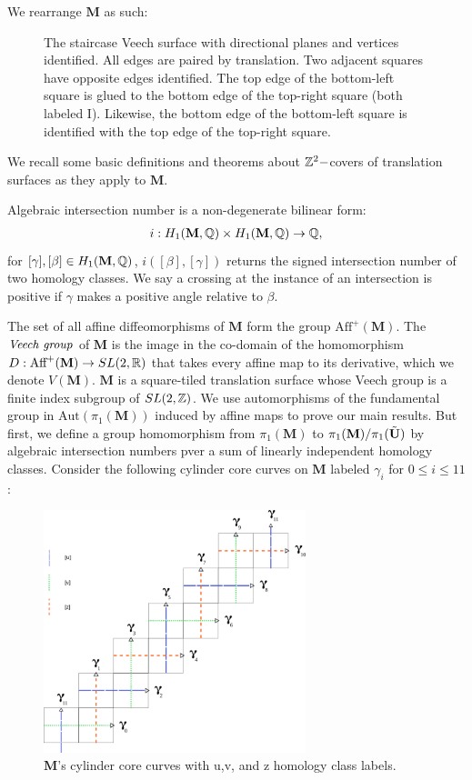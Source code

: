 \documentclass[]{article}
\def\bM{\mathbf{M}}
\begin{document}
We rearrange $\bM$ as such:

\begin{figure}[H]
\centering

\caption{The staircase Veech surface with directional planes and vertices identified. All edges are paired by translation. Two adjacent squares have opposite edges identified. The top edge of the bottom-left square is glued to the bottom edge of the top-right square (both labeled I). Likewise, the bottom edge of the bottom-left square is identified with the top edge of the top-right square.}
\label{fig:staircase}
\end{figure}

\noindent We recall some basic definitions and theorems about $\mathbb{Z}^2-$covers of translation surfaces as they apply to $\bM$. 

\begin{Def}
Algebraic intersection number is a non-degenerate bilinear form:
\begin{align*}
i:H_1(\bM,\QQ)\times H_1(\bM,\QQ)\rightarrow\QQ,
\end{align*}
for $[\gamma],[\beta]\in H_1(\mathbf{M},\mathbb{Q})$, $i([\beta],[\gamma])$ returns the signed intersection number of two homology classes. We say a crossing at the instance of an intersection is positive if $\gamma$ makes a positive angle relative to $\beta$. 
\end{Def}
The set of all affine diffeomorphisms of $\bM$ form the group $\text{Aff}^+(\bM)$. The $\emph{Veech group}$ of $\bM$ is the image in the co-domain of the homomorphism $D:\text{Aff}^+(\bM)\rightarrow SL(2,\RR)$ that takes every affine map to its derivative, which we denote $V(\bM)$. $\bM$ is a square-tiled translation surface whose Veech group is a finite index subgroup of $SL(2,\mathbb{Z})$. We use automorphisms of the fundamental group in $\text{Aut}(\pi_1(\bM))$ induced by affine maps to prove our main results. But first, we define a group homomorphism from $\pi_1(\bM)$ to $\pi_1(\bM)/\pi_1(\btU)$ by algebraic intersection numbers pver a sum of linearly independent homology classes. Consider the following cylinder core curves on $\bM$ labeled $\gamma_i$ for $0\leq i\leq 11$:
\begin{figure}[H]
\includegraphics[width=3in]{homologyclass.png}
\centering
\caption{$\bM$'s cylinder core curves with u,v, and z homology class labels.}
\label{fig:homology}
\end{figure}
\end{document}

